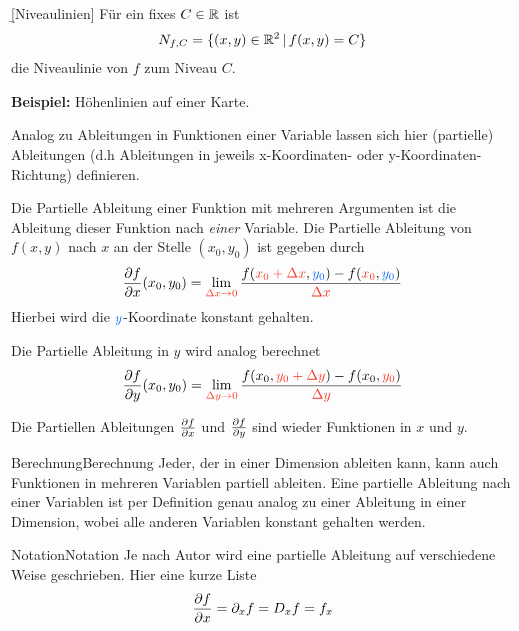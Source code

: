 \documentclass[12pt]{article}
\begin{document}
\begin{defn}{\b{[Niveaulinien]}}
        Für ein fixes $C\in\mathbb{R}$ ist
        \begin{align}
                N_{f,C}=\{(x,y)\in\mathbb{R}^2\,|\,f(x,y)=C\}
        \end{align}
        die Niveaulinie von $f$ zum Niveau $C$.

        \textbf{Beispiel:} Höhenlinien auf einer Karte.
\end{defn}

Analog zu Ableitungen in Funktionen einer Variable lassen sich hier (partielle)
Ableitungen (d.h Ableitungen in jeweils x-Koordinaten- oder
y-Koordinaten-Richtung) definieren.

\begin{thmb}{\emph{}}
        Die Partielle Ableitung einer Funktion mit mehreren Argumenten ist die Ableitung dieser Funktion nach \emph{einer} Variable. Die \r{Partielle Ableitung von $f(x,y)$ nach $x$ an der Stelle $(x_0,y_0)$} ist gegeben durch
        \begin{align}
                \pdv{f}{x}(x_0,y_0)=\lim_{\r{\Delta x\to0}}\frac{f(\r{x_0+\Delta x},\b{y_0})-f(\r{x_0},\b{y_0
                        })}{\r{\Delta x}}
        \end{align}
        Hierbei wird die $\b y$-Koordinate konstant gehalten.

        Die Partielle Ableitung in \r{$y$} wird analog berechnet
        \begin{align}
                \pdv{f}{y}(x_0,y_0)=\lim_{\r{\Delta y\to0}}\frac{f(x_0,\r{y_0+\Delta y})-f(x_0,\r{y_0})}{\r{\Delta y}}
        \end{align}
\end{thmb}

Die Partiellen Ableitungen $\pdv{f}{x}$ und $\pdv{f}{y}$ sind wieder Funktionen
in $x$ und $y$.

\begin{rmk}{Berechnung}{Berechnung}
        Jeder, der in einer Dimension ableiten kann, kann auch Funktionen in mehreren Variablen partiell ableiten. Eine partielle Ableitung nach einer Variablen ist per Definition genau analog zu einer Ableitung in einer Dimension, wobei alle anderen Variablen konstant gehalten werden.
\end{rmk}

\begin{rmk}{Notation}{Notation}
        Je nach Autor wird eine partielle Ableitung auf verschiedene Weise geschrieben. Hier eine kurze Liste
        \begin{align*}
                \pdv{f}{x} = \partial_x f = D_x f = f_x
        \end{align*}
\end{rmk}\vspace*{1em}
\end{document}
